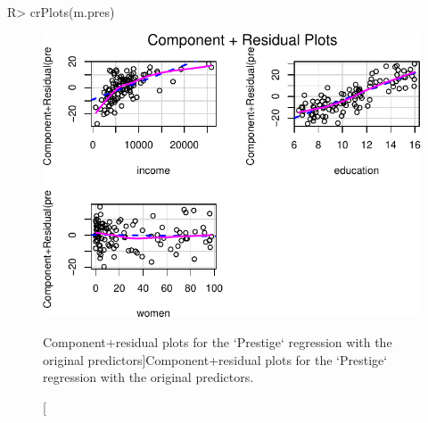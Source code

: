 \documentclass[
]{jss}
\begin{document}
\begin{CodeChunk}
\begin{CodeInput}
R> crPlots(m.pres)
\end{CodeInput}
\begin{figure}

{\centering \includegraphics{JSS-article-reduced_files/figure-latex/CR-plots-untransformed-1} 

}

\caption[Component+residual plots for the `Prestige` regression with the original predictors]{Component+residual plots for the `Prestige` regression with the original predictors.}\label{fig:CR-plots-untransformed}
\end{figure}
\end{CodeChunk}
\end{document}
